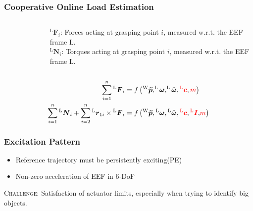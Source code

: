 \documentclass[student,noshadow]{ITRslides}
\renewcommand{\vec}[1]{\boldsymbol{#1}}
\renewcommand{\vec}[1]{\boldsymbol{#1}}
\newcommand{\scr}[1]{\mathrm{#1}}
\begin{document}
\begin{frame}
	\frametitle{Cooperative Online Load Estimation}
	\begin{columns}
		\begin{column}{0.5\textwidth}
			\begin{figure}
				\centering
				
			\end{figure}	
		\end{column}
		\begin{column}{0.5\textwidth}
			$^\scr{L}\vec{F}_i$: Forces acting at grasping point $i$, measured w.r.t. the EEF frame L.\\ \vspace{0.3cm}
			$^\scr{L}\vec{N}_i$: Torques acting at grasping point $i$, measured w.r.t. the EEF frame L.\\
		\end{column}
	\end{columns}
	
	\begin{align*} 
		\sum_{i = 1}^{n}  {^\scr{L}}\vec{F}_{i}                                                                   & =  f\left(^\scr{W}\vec{\ddot{p}},^\scr{L}\vec{\omega},^\scr{L}\vec{\dot{\omega}},\color{red}^\scr{L}\vec{c}\color{black},\color{red}m\color{black}\right)                          \\ 
		\sum_{i = 1}^n {^\scr{L}}\vec{N}_{i} + \sum_{i = 2}^n {^\scr{L}}\vec{r}_{1i} \times {^\scr{L}}\vec{F}_{i} & = f\left({^\scr{W}}\vec{\ddot{p}},{^\scr{L}}\vec{\omega},{^\scr{L}}\vec{\dot{\omega}},\color{red}{^\scr{L}}\vec{c}\color{black},\color{red}{{^\scr{L}}\vec{I}}\color{black}{,}\color{red}{m} \color{black}\right) 
	\end{align*}
\end{frame}

\begin{frame}
	\frametitle{Excitation Pattern}
	\vspace{1cm}	
	\begin{itemize}
		\item Reference trajectory must be persistently exciting(PE)
		\item Non-zero acceleration of EEF in 6-DoF \cite{literaturstelle3}
	\end{itemize}
	\vspace{1cm}
	\textsc{Challenge}: Satisfaction of actuator limits, especially when trying to identify big objects.
\end{frame}
\end{document}
